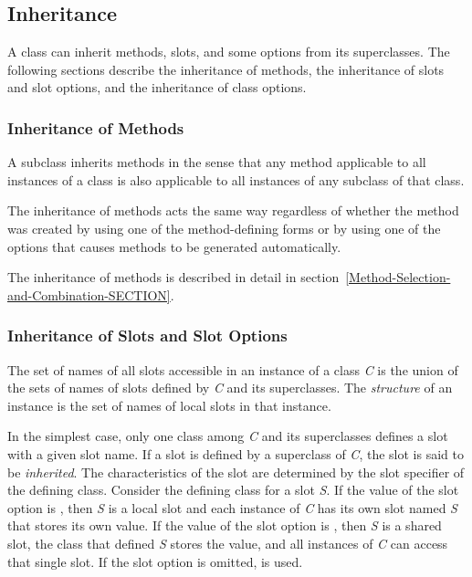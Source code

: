 \subsection{Inheritance}
\label{Inheritance-SECTION}

A class can inherit methods, slots, and some  options
from its superclasses.  The following sections describe the inheritance of
methods, the inheritance of slots and slot options, and the inheritance of
class options.
 
\subsubsection{Inheritance of Methods}
\label{Inheritance-of-Methods-SECTION}

A subclass inherits methods in the sense that any method applicable to
all instances of a class is also applicable to all instances of any
subclass of that class.

The inheritance of methods acts the same way regardless of whether the
method was created by using one of the method-defining forms or by
using one of the  options that causes methods to be
generated automatically.

The inheritance of methods is described in detail in
section~\ref{Method-Selection-and-Combination-SECTION}.

\subsubsection{Inheritance of Slots and Slot Options}
\label{Inheritance-of-Slots-and-Slot-Options-SECTION}

The set of names of all slots accessible in an instance of a class
\emph{C} is the union of the sets of names of slots defined by \emph{C} and its
superclasses. The \emph{structure} of an instance is the set of names
of local slots in that instance.

In the simplest case, only one class among \emph{C} and its superclasses
defines a slot with a given slot name.  If a slot is defined by a
superclass of \emph{C}, the slot is said to be \emph{inherited}.  The
characteristics of the slot are determined by the 
slot specifier of the defining class.  Consider the defining class for
a slot \emph{S}.  If the value of the  slot
option is , then \emph{S} is a local slot and each instance
of \emph{C} has its own slot named \emph{S} that stores its own value.  If the
value of the  slot option is , then \emph{S}
is a shared slot, the class that defined \emph{S} stores the value, and all
instances of \emph{C} can access that single slot.  If the 
 slot option is omitted,  is used.

